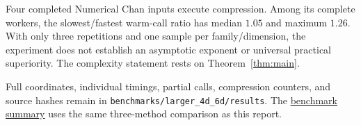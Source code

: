 Four completed Numerical Chan inputs execute compression. Among its
complete workers, the slowest/fastest warm-call ratio has median $1.05$
and maximum $1.26$. With only three repetitions and one sample per
family/dimension, the experiment does not establish an asymptotic
exponent or universal practical superiority. The complexity statement
rests on Theorem~\ref{thm:main}.

Full coordinates, individual timings, partial calls, compression counters,
and source hashes remain in \texttt{benchmarks/larger\_4d\_6d/results}.
The \href{https://github.com/emmerichmtm/FastHVChan/blob/main/NumericalChanHVND/benchmarks/larger_4d_6d/RESULTS.md}{benchmark summary}
uses the same three-method comparison as this report.
\clearpage
